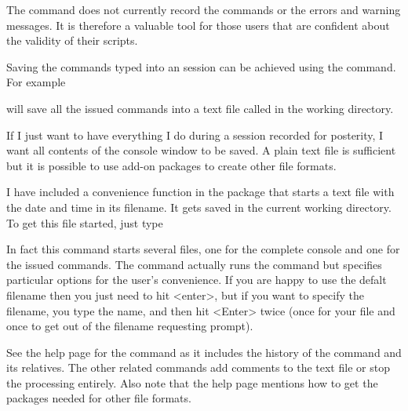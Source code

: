 The  command does not currently record the commands or the errors and warning messages. It is therefore a valuable tool for those \R{} users that are confident about the validity of their scripts. 
 
Saving the commands typed into an \R{} session can be achieved using the  command. For example 
\begin{knitrout}
\color{fgcolor}\begin{kframe}
\begin{alltt}
\hlstd{> }\hlstd{(}\hlstd{)}
\end{alltt}
\end{kframe}
\end{knitrout}
will save all the issued commands into a text file called  in the working directory.  
 
If I just want to have everything I do during a session recorded for posterity, I want all contents of the console window to be saved. A plain text file is sufficient but it is possible to use add-on packages to create other file formats. 
 
I have included a convenience function in the  package that starts a text file with the date and time in its filename. It gets saved in the current working directory. To get this file started, just type 
\begin{knitrout}
\color{fgcolor}\begin{kframe}
\begin{alltt}
\hlstd{> }\hlstd{()}
\end{alltt}
\end{kframe}
\end{knitrout}
In fact this command starts several files, one for the complete console and one for the issued commands. The command actually runs the  command but specifies particular options for the user's convenience. If you are happy to use the defalt filename then you just need to hit <enter>, but if you want to specify the filename, you type the name, and then hit <Enter> twice (once for your file and once to get out of the filename requesting prompt). 
 
See the help page for the  command as it includes the history of the command and its relatives. The other related commands add comments to the text file or stop the processing entirely. Also note that the help page mentions how to get the packages needed for other file formats. 
 
